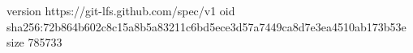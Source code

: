 version https://git-lfs.github.com/spec/v1
oid sha256:72b864b602c8c15a8b5a83211c6bd5ece3d57a7449ca8d7e3ea4510ab173b53e
size 785733
